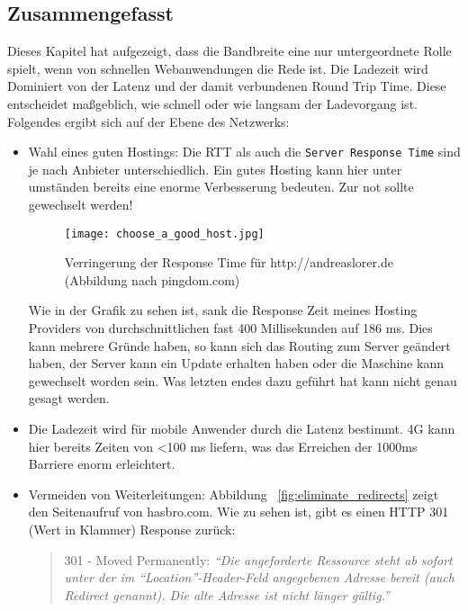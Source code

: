 
	\subsection{Zusammengefasst} %
	\label{sub:zusammengefasst}
		Dieses Kapitel hat aufgezeigt, dass die Bandbreite eine nur untergeordnete Rolle spielt, wenn von schnellen Webanwendungen die Rede ist. Die Ladezeit wird Dominiert von der Latenz und der damit verbundenen Round Trip Time. Diese entscheidet maßgeblich, wie schnell oder wie langsam der Ladevorgang ist.
		Folgendes ergibt sich auf der Ebene des Netzwerks:
		\begin{itemize}
			\item Wahl eines guten Hostings: Die RTT als auch die \texttt{Server Response Time} sind je nach Anbieter unterschiedlich. Ein gutes Hosting kann hier unter umständen bereits eine enorme Verbesserung bedeuten. Zur not sollte gewechselt werden!

			\begin{figure}[htbp]
				\begin{center}
					\texttt{[image: choose\_a\_good\_host.jpg]}
					\caption{Verringerung der Response Time für http://andreaslorer.de (Abbildung nach pingdom.com)}
					\label{fig:choose_a_good_host}
				\end{center}
			\end{figure}
			
			Wie in der Grafik zu sehen ist, sank die Response Zeit meines Hosting Providers von durchschnittlichen fast 400 Millisekunden auf 186 ms. Dies kann mehrere Gründe haben, so kann sich das Routing zum Server geändert haben, der Server kann ein Update erhalten haben oder die Maschine kann gewechselt worden sein. Was letzten endes dazu geführt hat kann nicht genau gesagt werden.
			\item Die Ladezeit wird für mobile Anwender durch die Latenz bestimmt. 4G kann hier bereits Zeiten von <100 ms liefern, was das Erreichen der 1000ms Barriere enorm erleichtert.

			\item Vermeiden von Weiterleitungen: Abbildung ~\ref{fig:eliminate_redirects} zeigt den Seitenaufruf von hasbro.com. Wie zu sehen ist, gibt es einen HTTP 301 (Wert in Klammer) Response zurück: 

			\begin{quote}
				301 - Moved Permanently: \textit{"`Die angeforderte Ressource steht ab sofort unter der im "`Location"'-Header-Feld angegebenen Adresse bereit (auch Redirect genannt). Die alte Adresse ist nicht länger gültig."'} \autocite{wikipediaHTTP}
			\end{quote}


\end{itemize}
